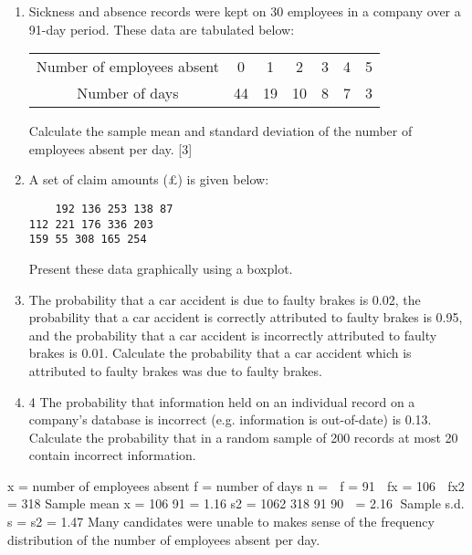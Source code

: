 \documentclass[a4paper,12pt]{article}
\begin{document}
\begin{enumerate}

\item Sickness and absence records were kept on 30 employees in a company over a 91-day
period. These data are tabulated below:
\begin{center}
\begin{tabular}{c|c|c|c|c|c|c|}
Number of employees absent & 0 & 1 & 2 & 3 & 4 & 5\\
Number of days & 44 & 19 & 10 & 8 & 7 & 3 \\
\end{tabular}
\end{center}


Calculate the sample mean and standard deviation of the number of employees absent
per day. [3]

\item A set of claim amounts (£) is given below:
\begin{verbatim}
    192 136 253 138 87
112 221 176 336 203
159 55 308 165 254
\end{verbatim}

Present these data graphically using a boxplot. 

\item  The probability that a car accident is due to faulty brakes is 0.02, the probability that a
car accident is correctly attributed to faulty brakes is 0.95, and the probability that a
car accident is incorrectly attributed to faulty brakes is 0.01.
Calculate the probability that a car accident which is attributed to faulty brakes was
due to faulty brakes. 
\item 4 The probability that information held on an individual record on a company's
database is incorrect (e.g. information is out-of-date) is 0.13.
Calculate the probability that in a random sample of 200 records at most 20 contain
incorrect information. 
\end{enumerate}


 x = number of employees absent
f = number of days
n =  f = 91  fx = 106  fx2 = 318
Sample mean x = 106
91
= 1.16
s2 =
1062 318
91
90

= 2.16  Sample s.d. s = s2 = 1.47
Many candidates were unable to makes sense of the frequency distribution of the number of employees
absent per day.
\end{document}
